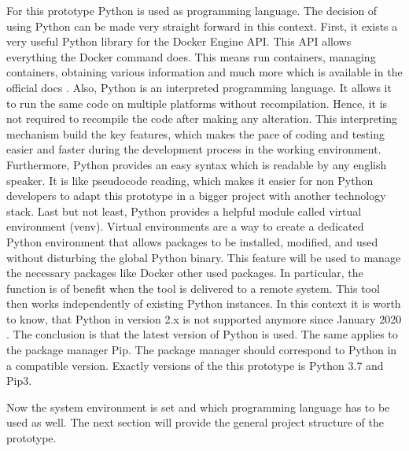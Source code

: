 For this prototype Python is used as programming language. The decision of using Python can be made very straight forward in this context. First, it exists a very useful Python library for the Docker Engine API. This API allows everything the Docker command does. This means run containers, managing containers, obtaining various information and much more which is available in the official docs \cite{python_sdk}. Also, Python is an interpreted programming language. It allows it to run the same code on multiple platforms without recompilation. Hence, it is not required to recompile the code after making any alteration. This interpreting mechanism build the key features, which makes the pace of coding and testing easier and faster during the development process in the working environment. 
Furthermore, Python provides an easy syntax which is readable by any english speaker. It is like pseudocode reading, which makes it easier for non Python developers to adapt this prototype in a bigger project with another technology stack. Last but not least, Python provides a helpful module called virtual environment (venv). Virtual environments are a way to create a dedicated Python environment that allows packages to be installed, modified, and used without disturbing the global Python binary. This feature will be used to manage the necessary packages like Docker other used packages. In particular, the function is of benefit when the tool is delivered to a remote system. This tool then works independently of existing Python instances. In this context it is worth to know, that Python in version 2.x is not supported anymore since January 2020 \cite{python_deprecated}. The conclusion is that the latest version of Python is used. The same applies to the package manager Pip. The package manager should correspond to Python in a compatible version. 
Exactly versions of the this prototype is Python 3.7 and Pip3.

Now the system environment is set and which programming language has to be used as well. The next section will provide the general project structure of the prototype.